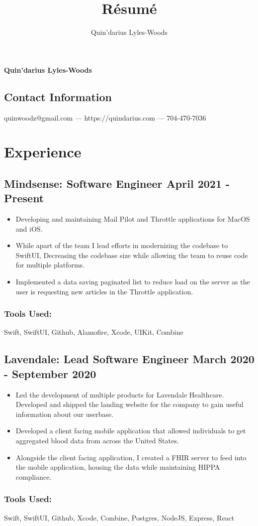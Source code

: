 \documentclass{article}
\makeatletter
\renewcommand{\maketitle}
{
\begin{center}
{\huge\bfseries
Quin'darius Lyles-Woods
}
\end{center}
\vspace{.25em}
\subsection{Contact Information}
quinwoodz@gmail.com --- https://quindarius.com --- 704-470-7036
}
\makeatother
\begin{document}
\title{R\'esum\'e}
\author{Quin'darius Lyles-Woods}
\maketitle
\thispagestyle{empty}
\section{Experience}
\subsection{\large{Mindsense}: Software Engineer \hfill \small{April 2021 - Present}}
\begin{itemize}
\setlength\itemsep{.1em}
	\item Developing and maintaining Mail Pilot and Throttle applications for MacOS and iOS.
	\item While apart of the team I lead efforts in modernizing the codebase to SwiftUI, Decreasing the codebase size while allowing the team to reuse code for multiple platforms. 
	\item Implemented a data saving paginated list to reduce load on the server as the user is requesting new articles in the Throttle application. 
\end{itemize}
\subsubsection{Tools Used: } Swift, SwiftUI, Github, Alamofire, Xcode, UIKit, Combine
\subsection{\large{Lavendale}: Lead Software Engineer \hfill \small{March 2020 - September 2020}}
\begin{itemize}
\setlength\itemsep{.1em}
	\item Led the development of multiple products for Lavendale Healthcare. Developed and shipped the landing website for the company to gain useful information about our userbase. 
	\item Developed a client facing mobile application that allowed individuals to get aggregated blood data from across the United States.
	\item Alongside the client facing application, I created a FHIR server to feed into the mobile application, housing the data while maintaining HIPPA compliance.
\end{itemize}
\subsubsection{Tools Used: } Swift, SwiftUI, Github, Xcode, Combine, Postgres, NodeJS, Express, React
\end{document}
